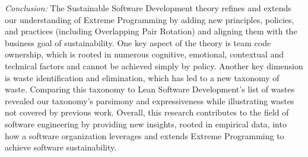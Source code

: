 \textit{Conclusion:} The Sustainable Software Development theory refines and extends our understanding of Extreme Programming by adding new principles, policies, and practices (including Overlapping Pair Rotation) and aligning them with the business goal of sustainability. One key aspect of the theory is team code ownership, which is rooted in numerous cognitive, emotional, contextual and technical factors and cannot be achieved simply by policy. Another key dimension is waste identification and elimination, which has led to a new taxonomy of waste. Comparing this taxonomy to Lean Software Development's list of wastes revealed our taxonomy's parsimony and expressiveness while illustrating wastes not covered by previous work. Overall, this research contributes to the field of software engineering by providing new insights, rooted in empirical data, into how a software organization leverages and extends Extreme Programming to achieve software sustainability.